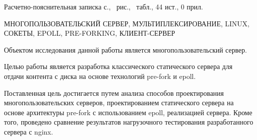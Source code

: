 
Расчетно-пояснительная записка \pageref{LastPage} с., \totalfigures\ рис., \totaltables\ табл., 44 ист., 0 прил.

МНОГОПОЛЬЗОВАТЕЛЬСКИЙ СЕРВЕР,
МУЛЬТИПЛЕКСИРОВАНИЕ,
LINUX,
СОКЕТЫ,
EPOLL,
PRE-FORKING,
КЛИЕНТ-СЕРВЕР

Объектом исследования данной работы является многопользовательский сервер.

Целью работы является разработка классического статического сервера для отдачи контента с диска на основе технологий pre-fork и epoll.

Поставленная цель достигается путем анализа способов проектирования многопользовательских серверов, проектированием статического сервера на основе архитектуры pre-fork с использованием epoll, реализацией сервера. Кроме того, проведено сравнение результатов нагрузочного тестирования разработанного сервера с nginx.


\pagebreak